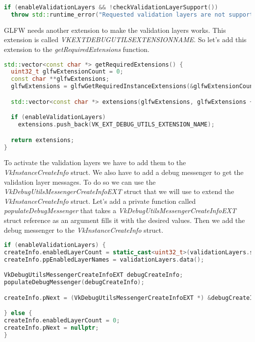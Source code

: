 \documentclass[12pt]{report} \usepackage{preamble}
\begin{document}
\newpage

\begin{lstlisting}[language=C++]
if (enableValidationLayers && !checkValidationLayerSupport())
  throw std::runtime_error("Requested validation layers are not supported!");
\end{lstlisting}

GLFW needs another extension to make the validation layers works. This extension is called
\textit{VK\textunderscore EXT\textunderscore DEBUG\textunderscore UTILS\textunderscore EXTENSION\textunderscore NAME}.
So let's add this extension to the \textit{getRequiredExtensions} function.

\begin{lstlisting}[language=C++]
std::vector<const char *> getRequiredExtensions() {
  uint32_t glfwExtensionCount = 0;
  const char **glfwExtensions;
  glfwExtensions = glfwGetRequiredInstanceExtensions(&glfwExtensionCount);

  std::vector<const char *> extensions(glfwExtensions, glfwExtensions + glfwExtensionCount);

  if (enableValidationLayers)
    extensions.push_back(VK_EXT_DEBUG_UTILS_EXTENSION_NAME);

  return extensions;
}
\end{lstlisting}

To activate the validation layers we have to add them to the \textit{VkInstanceCreateInfo} struct.
We also have to add a debug messenger to get the validation layer messages. To do so we can
use the \textit{VkDebugUtilsMessengerCreateInfoEXT} struct that we will use to extend the
\textit{VkInstanceCreateInfo} struct. Let's add a private function called \textit{populateDebugMessenger}
that takes a \textit{VkDebugUtilsMessengerCreateInfoEXT} struct reference as an argument fills it with
the desired values. Then we add the debug messenger to the \textit{VkInstanceCreateInfo} struct.

\newpage

\begin{lstlisting}[language=C++]
if (enableValidationLayers) {
createInfo.enabledLayerCount = static_cast<uint32_t>(validationLayers.size());
createInfo.ppEnabledLayerNames = validationLayers.data();

VkDebugUtilsMessengerCreateInfoEXT debugCreateInfo;
populateDebugMessenger(debugCreateInfo);

createInfo.pNext = (VkDebugUtilsMessengerCreateInfoEXT *) &debugCreateInfo;

} else {
createInfo.enabledLayerCount = 0;
createInfo.pNext = nullptr;
}
\end{lstlisting}
\end{document}
